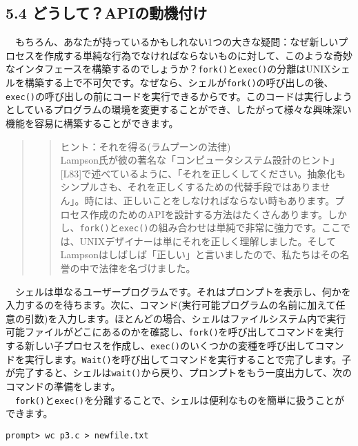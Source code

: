\hypertarget{ux3069ux3046ux3057ux3066apiux306eux52d5ux6a5fux4ed8ux3051}{%
\subsection*{5.4
どうして？APIの動機付け}\label{ux3069ux3046ux3057ux3066apiux306eux52d5ux6a5fux4ed8ux3051}}

　もちろん、あなたが持っているかもしれない1つの大きな疑問：なぜ新しいプロセスを作成する単純な行為でなければならないものに対して、このような奇妙なインタフェースを構築するのでしょうか？\texttt{fork()}と\texttt{exec()}の分離はUNIXシェルを構築する上で不可欠です。なぜなら、シェルが\texttt{fork()}の呼び出しの後、\texttt{exec()}の呼び出しの前にコードを実行できるからです。このコードは実行しようとしているプログラムの環境を変更することができ、したがって様々な興味深い機能を容易に構築することができます。

\begin{quote}
\begin{quote}
ヒント：それを得る(ラムプーンの法律)\\
Lampson氏が彼の著名な「コンピュータシステム設計のヒント」{[}L83{]}で述べているように、「それを正しくしてください。抽象化もシンプルさも、それを正しくするための代替手段ではありません」。時には、正しいことをしなければならない時もあります。プロセス作成のためのAPIを設計する方法はたくさんあります。しかし、\texttt{fork()}と\texttt{exec()}の組み合わせは単純で非常に強力です。ここでは、UNIXデザイナーは単にそれを正しく理解しました。そしてLampsonはしばしば「正しい」と言いましたので、私たちはその名誉の中で法律を名づけました。
\end{quote}
\end{quote}

　シェルは単なるユーザープログラムです。それはプロンプトを表示し、何かを入力するのを待ちます。次に、コマンド(実行可能プログラムの名前に加えて任意の引数)を入力します。ほとんどの場合、シェルはファイルシステム内で実行可能ファイルがどこにあるのかを確認し、\texttt{fork()}を呼び出してコマンドを実行する新しい子プロセスを作成し、\texttt{exec()}のいくつかの変種を呼び出してコマンドを実行します。\texttt{Wait()}を呼び出してコマンドを実行することで完了します。子が完了すると、シェルは\texttt{wait()}から戻り、プロンプトをもう一度出力して、次のコマンドの準備をします。\\
　\texttt{fork()}と\texttt{exec()}を分離することで、シェルは便利なものを簡単に扱うことができます。

\begin{verbatim}
prompt> wc p3.c > newfile.txt
\end{verbatim}

